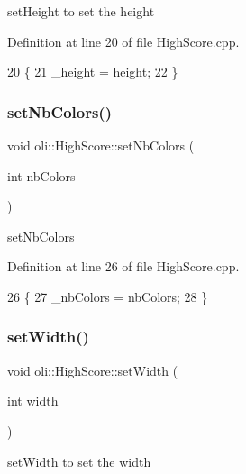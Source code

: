 set\+Height to set the height 



Definition at line 20 of file High\+Score.\+cpp.


\begin{DoxyCode}
20                                    \{
21     \_height = height;
22 \}
\end{DoxyCode}
\hypertarget{classoli_1_1_high_score_a1f4db3a9679c923b21530a91d17d40fa}{}\label{classoli_1_1_high_score_a1f4db3a9679c923b21530a91d17d40fa} 
\subsubsection{\texorpdfstring{set\+Nb\+Colors()}{setNbColors()}}
{\footnotesize\ttfamily void oli\+::\+High\+Score\+::set\+Nb\+Colors (\begin{DoxyParamCaption}\item[{int}]{nb\+Colors }\end{DoxyParamCaption})}



set\+Nb\+Colors 



Definition at line 26 of file High\+Score.\+cpp.


\begin{DoxyCode}
26                                        \{
27     \_nbColors = nbColors;
28 \}
\end{DoxyCode}
\hypertarget{classoli_1_1_high_score_a161063aa9576b92bf4d1f64af7a7850c}{}\label{classoli_1_1_high_score_a161063aa9576b92bf4d1f64af7a7850c} 
\subsubsection{\texorpdfstring{set\+Width()}{setWidth()}}
{\footnotesize\ttfamily void oli\+::\+High\+Score\+::set\+Width (\begin{DoxyParamCaption}\item[{int}]{width }\end{DoxyParamCaption})}



set\+Width to set the width 



